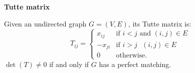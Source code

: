 \textbf{Tutte matrix}

Given an undirected graph $G=(V, E)$, its Tutte matrix is:
\[
T_{i j} = \begin{cases} 
      x_{i j} & \text{if $i < j$ and $(i, j) \in E$} \\
      -x_{j i} & \text{if $i > j$ $(i, j) \in E$} \\
      0 & \text{otherwise.}
   \end{cases}
\]
$\det(T) \ne 0$ if and only if $G$ has a perfect matching.
